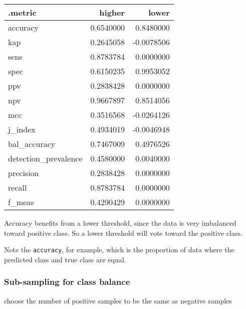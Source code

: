 \documentclass[
]{article}
\newenvironment{Shaded}{\begin{snugshade}}{\end{snugshade}}
\newcommand{\AttributeTok}[1]{\textcolor[rgb]{0.13,0.29,0.53}{#1}}
\newcommand{\FunctionTok}[1]{\textcolor[rgb]{0.13,0.29,0.53}{\textbf{#1}}}
\newcommand{\NormalTok}[1]{#1}
\newcommand{\OtherTok}[1]{\textcolor[rgb]{0.56,0.35,0.01}{#1}}
\newcommand{\SpecialCharTok}[1]{\textcolor[rgb]{0.81,0.36,0.00}{\textbf{#1}}}
\begin{document}
\begin{longtable}[]{@{}lrr@{}}
\toprule\noalign{}
.metric & higher & lower \\
\midrule\noalign{}
\endhead
\bottomrule\noalign{}
\endlastfoot
accuracy & 0.6540000 & 0.8480000 \\
kap & 0.2645058 & -0.0078506 \\
sens & 0.8783784 & 0.0000000 \\
spec & 0.6150235 & 0.9953052 \\
ppv & 0.2838428 & 0.0000000 \\
npv & 0.9667897 & 0.8514056 \\
mcc & 0.3516568 & -0.0264126 \\
j\_index & 0.4934019 & -0.0046948 \\
bal\_accuracy & 0.7467009 & 0.4976526 \\
detection\_prevalence & 0.4580000 & 0.0040000 \\
precision & 0.2838428 & 0.0000000 \\
recall & 0.8783784 & 0.0000000 \\
f\_meas & 0.4290429 & 0.0000000 \\
\end{longtable}

Accuracy benefits from a lower threshold, since the data is very
imbalanced toward positive class. So a lower threshold will vote toward
the positive class.

Note the \texttt{accuracy}, for example, which is the proportion of data
where the predicted class and true class are equal.

\subsubsection{Sub-sampling for class
balance}\label{sub-sampling-for-class-balance}

choose the number of positive samples to be the same as negative samples

\begin{Shaded}
\end{Shaded}
\end{document}
